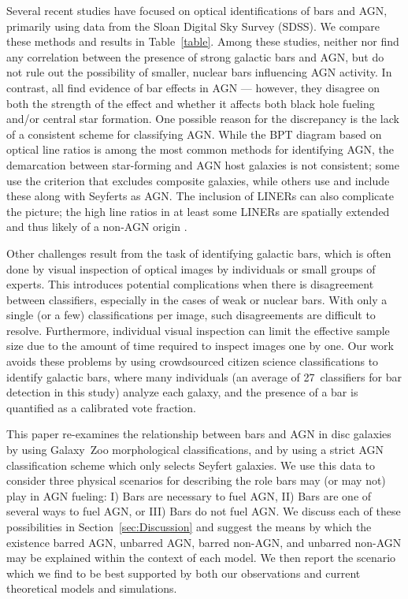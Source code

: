 Several recent studies have focused on optical identifications of bars and AGN, primarily using data from the Sloan Digital Sky Survey (SDSS). We compare these methods and results in Table~\ref{table}. Among these studies, neither \citet{Lee2012} nor \citet{Martini2003} find any correlation between the presence of strong galactic bars and AGN, but do not rule out the possibility of smaller, nuclear bars influencing AGN activity. In contrast, \citet{Oh2012,Hao2009a,Alonso2013} all find evidence of bar effects in AGN --- however, they disagree on both the strength of the effect and whether it affects both black hole fueling and/or central star formation. One possible reason for the discrepancy is the lack of a consistent scheme for classifying AGN. While the BPT diagram based on optical line ratios \citep{Baldwin1981} is among the most common methods for identifying AGN, the demarcation between star-forming and AGN host galaxies is not consistent; some use the \citet{Kewley2001} criterion that excludes composite galaxies, while others use \citet{Kauffmann2003a} and include these along with Seyferts as AGN. The inclusion of LINERs can also complicate the picture; the high line ratios in at least some LINERs are spatially extended and thus likely of a non-AGN origin \citep{Sarzi2010,Yan2012,Singh2013}. 

Other challenges result from the task of identifying galactic bars, which is often done by visual inspection of optical images by individuals or small groups of experts. This introduces potential complications when there is disagreement between classifiers, especially in the cases of weak or nuclear bars. With only a single (or a few) classifications per image, such disagreements are difficult to resolve. Furthermore, individual visual inspection can limit the effective sample size due to the amount of time required to inspect images one by one. Our work avoids these problems by using crowdsourced citizen science classifications to identify galactic bars, where many individuals (an average of 27~classifiers for bar detection in this study) analyze each galaxy, and the presence of a bar is quantified as a calibrated vote fraction.
   
This paper re-examines the relationship between bars and AGN in disc galaxies by using Galaxy~Zoo morphological classifications, and by using a strict AGN classification scheme which only selects Seyfert galaxies. We use this data to consider three physical scenarios for describing the role bars may (or may not) play in AGN fueling: I) Bars are necessary to fuel AGN, II) Bars are one of several ways to fuel AGN, or III) Bars do not fuel AGN. We discuss each of these possibilities in Section~\ref{sec:Discussion} and suggest the means by which the existence barred AGN, unbarred AGN, barred non-AGN, and unbarred non-AGN may be explained within the context of each model. We then report the scenario which we find to be best supported by both our observations and current theoretical models and simulations.  

